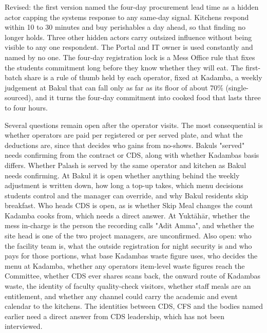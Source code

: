 \documentclass[
  10pt,
  table]{article}
\begin{document}
Revised: the first version named the four-day procurement lead time as a hidden actor capping the system\textquotesingle s response to any same-day signal. Kitchens respond within 10 to 30 minutes and buy perishables a day ahead, so that finding no longer holds. Three other hidden actors carry outsized influence without being visible to any one respondent. The Portal and IT owner is used constantly and named by no one. The four-day registration lock is a Mess Office rule that fixes the student\textquotesingle s commitment long before they know whether they will eat. The first-batch share is a rule of thumb held by each operator, fixed at Kadamba, a weekly judgement at Bakul that can fall only as far as its floor of about 70\% (single-sourced), and it turns the four-day commitment into cooked food that lasts three to four hours.

Several questions remain open after the operator visits. The most consequential is whether operators are paid per registered or per served plate, and what the deductions are, since that decides who gains from no-shows. Bakul\textquotesingle s "served" needs confirming from the contract or CDS, along with whether Kadamba\textquotesingle s basis differs. Whether Palash is served by the same operator and kitchen as Bakul needs confirming. At Bakul it is open whether anything behind the weekly adjustment is written down, how long a top-up takes, which menu decisions students control and the manager can override, and why Bakul residents skip breakfast. Who heads CDS is open, as is whether Skip Meal changes the count Kadamba cooks from, which needs a direct answer. At Yuktāhār, whether the mess in-charge is the person the recording calls "Adit Amma", and whether the site head is one of the two project managers, are unconfirmed. Also open: who the facility team is, what the outside registration for night security is and who pays for those portions, what base Kadamba\textquotesingle s waste figure uses, who decides the menu at Kadamba, whether any operator\textquotesingle s item-level waste figures reach the Committee, whether CDS ever shares scans back, the onward route of Kadamba\textquotesingle s waste, the identity of faculty quality-check visitors, whether staff meals are an entitlement, and whether any channel could carry the academic and event calendar to the kitchens. The identities between CDS, CFS and the bodies named earlier need a direct answer from CDS leadership, which has not been interviewed.
\end{document}
